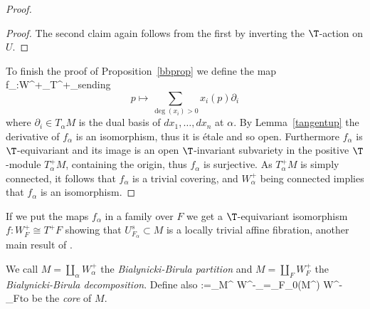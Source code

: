 \begin{proof}
\begin{proof}
		The second claim again follows from the first by inverting the $\T$-action on $U$.
	\end{proof}

	To finish the proof of Proposition~\ref{bbprop} we define the map \beq\label{model}f_\alpha:W^+_\alpha\to T^+_\alpha\eeq sending $$p\mapsto \sum_{\deg(x_i)>0} x_i(p)\partial_i$$ where $\partial_i\in T_\alpha M$ is the dual basis of $dx_1,\dots,dx_n$ at $\alpha$. By Lemma~\ref{tangentup} the derivative of $f_\alpha$  is an isomorphism, thus it is \'etale and so open. Furthermore $f_\alpha$ is $\T$-equivariant and  its image is an open $\T$-invariant subvariety in the positive $\T$-module $T^+_\alpha M$, containing the origin, thus $f_\alpha$ is surjective. As $T^+_\alpha M$ is simply connected, it follows that $f_\alpha$ is a trivial covering, and $W^+_\alpha$ being connected implies that $f_\alpha$ is an isomorphism.
\end{proof}

\begin{remark}
\notready \label{afffibr}
	If we put the maps $f_\alpha$ in a family over $F$ we get a $\T$-equivariant isomorphism $f:W^+_{F}\cong  T^+F$ showing that $U^s_{F_\alpha}\subset M$ is a locally trivial affine fibration, another main result of \cite{bialynicki-birula}.
\end{remark}


\begin{definition}
\notready	We call $M=\coprod _{\alpha}W^+_\alpha$ the {\em Bialynicki-Birula partition} and $M=\coprod _{F}W^+_F$ the {\em Bialynicki-Birula decomposition}. Define also \beq\label{core}\calC:=\coprod_{\alpha\in M^\T} W^-_\alpha=\coprod_{F\in \pi_0(M^\T)} W^-_F\eeq to be the {\em core} of $M$.

\end{definition}

